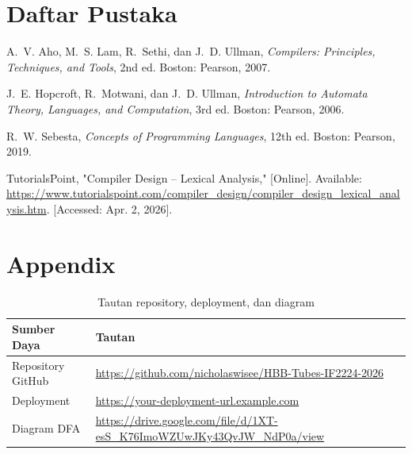 \documentclass[12pt,a4paper]{article}
\newcommand{\RepoURL}{https://github.com/nicholaswisee/HBB-Tubes-IF2224-2026}
\newcommand{\DeployURL}{https://your-deployment-url.example.com}
\newcommand{\DFAURL}{https://drive.google.com/file/d/1XT-esS_K76ImoWZUwJKy43QvJW_NdP0a/view}
\begin{document}
\newpage
{}
\section*{Daftar Pustaka}

\begin{enumerate}[label={[\arabic*]}, leftmargin=2.5em, itemsep=0.3em]

\item A.~V. Aho, M.~S. Lam, R.~Sethi, dan J.~D. Ullman, \textit{Compilers: Principles, Techniques, and Tools}, 2nd ed. Boston: Pearson, 2007.

\item J.~E. Hopcroft, R.~Motwani, dan J.~D. Ullman, \textit{Introduction to Automata Theory, Languages, and Computation}, 3rd ed. Boston: Pearson, 2006.

\item R.~W. Sebesta, \textit{Concepts of Programming Languages}, 12th ed. Boston: Pearson, 2019.

\item TutorialsPoint, "Compiler Design -- Lexical Analysis," [Online]. Available: \url{https://www.tutorialspoint.com/compiler_design/compiler_design_lexical_analysis.htm}. [Accessed: Apr. 2, 2026].

\end{enumerate}


\section*{Appendix}

\begin{table}[H]
  \centering
  \begin{small}
  \setlength{\tabcolsep}{5pt}
  \begin{tabular}{>{\raggedright\arraybackslash}p{3.1cm}>{\raggedright\arraybackslash}p{11.7cm}}
    \toprule
    \textbf{Sumber Daya} & \textbf{Tautan} \\
    \midrule
    Repository GitHub & \url{\RepoURL} \\
    Deployment      & \url{\DeployURL} \\
    Diagram DFA       & \url{\DFAURL} \\
    \bottomrule
  \end{tabular}
  \end{small}
  \caption{Tautan repository, deployment, dan diagram}
\end{table}
\end{document}
